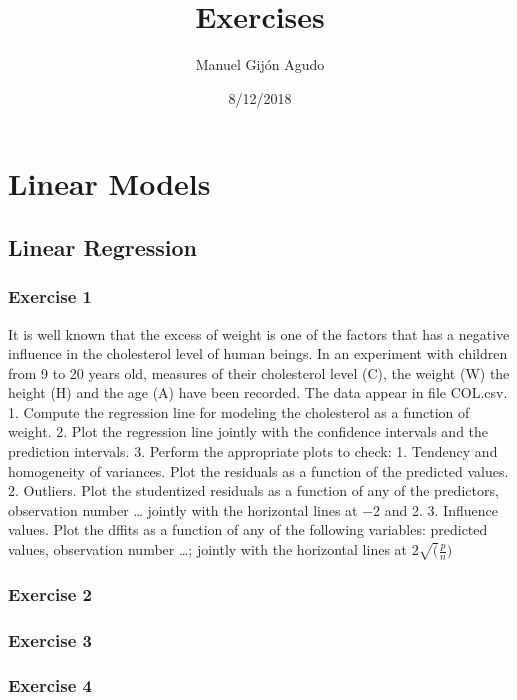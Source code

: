 \documentclass[english,]{article}
\title{Exercises}
\author{Manuel Gijón Agudo}
\date{8/12/2018}
\begin{document}
\maketitle

{
\setcounter{tocdepth}{2}
\tableofcontents
}
\section{Linear Models}\label{linear-models}

\subsection{Linear Regression}\label{linear-regression}

\subsubsection{Exercise 1}\label{exercise-1}

It is well known that the excess of weight is one of the factors that
has a negative influence in the cholesterol level of human beings. In an
experiment with children from 9 to 20 years old, measures of their
cholesterol level (C), the weight (W) the height (H) and the age (A)
have been recorded. The data appear in file COL.csv. 1. Compute the
regression line for modeling the cholesterol as a function of weight. 2.
Plot the regression line jointly with the confidence intervals and the
prediction intervals. 3. Perform the appropriate plots to check: 1.
Tendency and homogeneity of variances. Plot the residuals as a function
of the predicted values. 2. Outliers. Plot the studentized residuals as
a function of any of the predictors, observation number \ldots{} jointly
with the horizontal lines at −2 and 2. 3. Influence values. Plot the
dffits as a function of any of the following variables: predicted
values, observation number \ldots{}; jointly with the horizontal lines
at \(2 \sqrt(\frac{p}{n})\)

\subsubsection{Exercise 2}\label{exercise-2}

\subsubsection{Exercise 3}\label{exercise-3}

\subsubsection{Exercise 4}\label{exercise-4}
\end{document}
